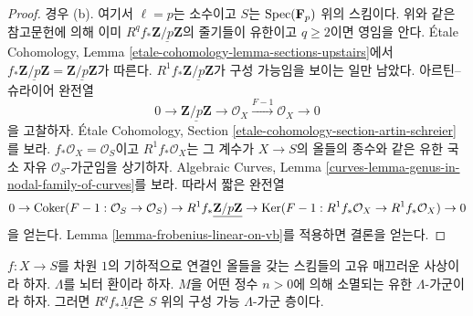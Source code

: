 \begin{proof}
\medskip\noindent
경우 (b). 여기서 $\ell = p$는 소수이고 $S$는
$\mathop{\mathrm{Spec}}(\mathbf{F}_p)$ 위의 스킴이다. 위와 같은 참고문헌에 의해 이미
$R^qf_*\underline{\mathbf{Z}/p\mathbf{Z}}$의 줄기들이 유한이고
$q \geq 2$이면 영임을 안다. \'Etale Cohomology, Lemma
\ref{etale-cohomology-lemma-sections-upstairs}에서
$f_*\underline{\mathbf{Z}/p\mathbf{Z}} =
\underline{\mathbf{Z}/p\mathbf{Z}}$가 따른다.
$R^1f_*\underline{\mathbf{Z}/p\mathbf{Z}}$가 구성 가능임을 보이는 일만
남았다. 아르틴--슈라이어 완전열
$$
0 \to \underline{\mathbf{Z}/p\mathbf{Z}} \to \mathcal{O}_X
\xrightarrow{F - 1} \mathcal{O}_X
\to 0
$$
을 고찰하자. \'Etale Cohomology, Section
\ref{etale-cohomology-section-artin-schreier}를 보라.
$f_*\mathcal{O}_X = \mathcal{O}_S$이고
$R^1f_*\mathcal{O}_X$는 그 계수가 $X \to S$의 올들의 종수와 같은
유한 국소 자유 $\mathcal{O}_S$-가군임을 상기하자. Algebraic Curves,
Lemma \ref{curves-lemma-genus-in-nodal-family-of-curves}를 보라.
따라서 짧은 완전열
$$
0 \to
\mathop{\mathrm{Coker}}(F - 1 : \mathcal{O}_S \to \mathcal{O}_S)
\to R^1f_*\underline{\mathbf{Z}/p\mathbf{Z}} \to
\mathop{\mathrm{Ker}}(F - 1 : R^1f_*\mathcal{O}_X \to R^1f_*\mathcal{O}_X)
\to 0
$$
을 얻는다. Lemma \ref{lemma-frobenius-linear-on-vb}를 적용하면
결론을 얻는다.
\end{proof}


\begin{lemma}
\label{lemma-proper-smooth-family-curves-modules}
$f : X \to S$를 차원 $1$의 기하적으로 연결인 올들을 갖는 스킴들의
고유 매끄러운 사상이라 하자. $\Lambda$를 뇌터 환이라 하자.
$M$을 어떤 정수 $n > 0$에 의해 소멸되는 유한 $\Lambda$-가군이라
하자. 그러면 $R^qf_*\underline{M}$은 $S$ 위의 구성 가능
$\Lambda$-가군 층이다.
\end{lemma}

